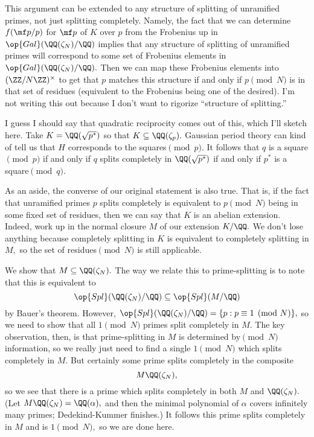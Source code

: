This argument can be extended to any structure of splitting of unramified primes, not just splitting completely. Namely, the fact that we can determine $f(\mf p/p)$ for $\mf p$ of $K$ over $p$ from the Frobenius up in $\op{Gal}(\QQ(\zeta_N)/\QQ)$ implies that any structure of splitting of unramified primes will correspond to some set of Frobenius elements in $\op{Gal}(\QQ(\zeta_N)/\QQ).$ Then we can map these Frobenius elements into $(\ZZ/N\ZZ)^\times$ to get that $p$ matches this structure if and only if $p\pmod N$ is in that set of residues (equivalent to the Frobenius being one of the desired). I'm not writing this out because I don't want to rigorize ``structure of splitting.''

I guess I should say that quadratic reciprocity comes out of this, which I'll sketch here. Take $K=\QQ(\sqrt{p^*})$ so that $K\subseteq\QQ(\zeta_p).$ Gaussian period theory can kind of tell us that $H$ corresponds to the squares$\pmod p.$ It follows that $q$ is a square$\pmod p$ if and only if $q$ splits completely in $\QQ(\sqrt{p^*})$ if and only if $p^*$ is a square$\pmod q.$

As an aside, the converse of our original statement is also true. That is, if the fact that unramified primes $p$ splits completely is equivalent to $p\pmod N$ being in some fixed set of residues, then we can say that $K$ is an abelian extension. Indeed, work up in the normal closure $M$ of our extension $K/\QQ.$ We don't lose anything because completely splitting in $K$ is equivalent to completely splitting in $M,$ so the set of residues$\pmod N$ is still applicable.

We show that $M\subseteq\QQ(\zeta_N).$ The way we relate this to prime-splitting is to note that this is equivalent to
\[\op{Spl}(\QQ(\zeta_N)/\QQ)\subseteq\op{Spl}(M/\QQ)\]
by Bauer's theorem. However, $\op{Spl}(\QQ(\zeta_N)/\QQ)=\{p:p\equiv1\pmod N\},$ so we need to show that all $1\pmod N$ primes split completely in $M.$ The key observation, then, is that prime-splitting in $M$ is determined by$\pmod N$ information, so we really just need to find a single $1\pmod N$ which splits completely in $M.$ But certainly some prime splits completely in the composite
\[M\QQ(\zeta_N),\]
so we see that there is a prime which splits completely in both $M$ and $\QQ(\zeta_N).$ (Let $M\QQ(\zeta_N)=\QQ(\alpha),$ and then the minimal polynomial of $\alpha$ covers infinitely many primes; Dedekind-Kummer finishes.) It follows this prime splits completely in $M$ and is $1\pmod N,$ so we are done here.

